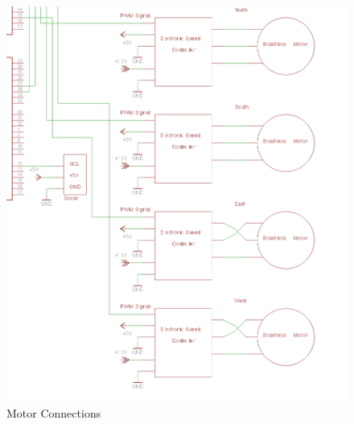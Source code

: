 \begin{figure}[htb]
\begin{center}
\includegraphics{motorsschem}
\caption{Motor Connections}
\end{center}
\end{figure}

